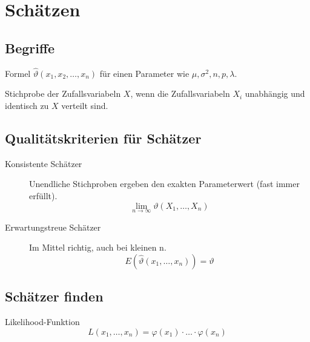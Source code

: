 \section{Schätzen}
\subsection{Begriffe}
\begin{description}
  \item[Schätzer] Formel $\hat{\vartheta}(x_1, x_2, \dots, x_n)$ für
  einen Parameter wie $\mu, \sigma^2, n, p, \lambda$.
  \item Stichprobe der Zufallsvariabeln $X$, wenn die Zufallsvariabeln
    $X_i$ unabhängig und identisch zu $X$ verteilt sind.
\end{description}
\subsection{Qualitätskriterien für Schätzer}
\begin{description}
  \item[Konsistente Schätzer] Unendliche Stichproben ergeben den exakten
  Parameterwert (fast immer erfüllt).
    \[ \lim_{n \rightarrow \infty} \vartheta(X_1, \dots, X_n) \]
  \item[Erwartungstreue Schätzer] Im Mittel richtig, auch bei kleinen n.
    \[ E(\hat{\vartheta}(x_1, \dots, x_n)) = \vartheta \]
\end{description}
\subsection{Schätzer finden}
Likelihood-Funktion
\[ L(x_1, \dots, x_n) = \varphi(x_1) \cdot \ldots \cdot \varphi(x_n)\]

